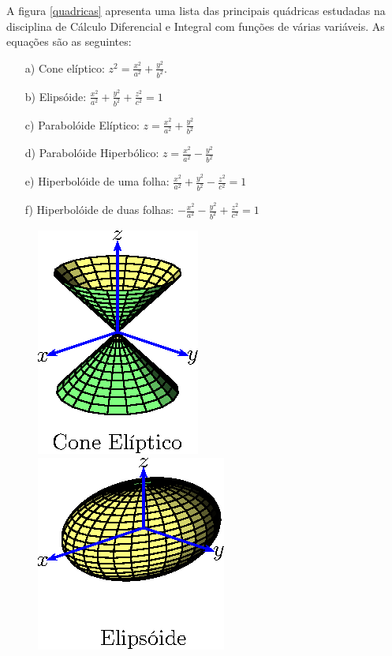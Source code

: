 \begin{ex}
A figura \ref{quadricas} apresenta uma lista das principais quádricas estudadas na disciplina de Cálculo Diferencial e Integral com funções de várias variáveis. As equações são as seguintes:
\begin{itemize}
\item[a)] Cone elíptico: $\displaystyle z^2=\frac{x^2}{a^2}+\frac{y^2}{b^2}$.
\item[b)] Elipsóide: $\displaystyle \frac{x^2}{a^2}+\frac{y^2}{b^2}+\frac{z^2}{c^2}=1$
\item[c)] Parabolóide Elíptico: $\displaystyle z=\frac{x^2}{a^2}+\frac{y^2}{b^2}$
\item[d)] Parabolóide Hiperbólico: $\displaystyle z=\frac{x^2}{a^2}-\frac{y^2}{b^2}$
\item[e)] Hiperbolóide de uma folha: $\displaystyle \frac{x^2}{a^2}+\frac{y^2}{b^2}-\frac{z^2}{c^2}=1$
\item[f)] Hiperbolóide de duas folhas:  $\displaystyle -\frac{x^2}{a^2}-\frac{y^2}{b^2}+\frac{z^2}{c^2}=1$
\end{itemize}
\begin{figure}[htp]
\begin{minipage}{5cm}
\includegraphics{cap_superficies/figs/figura_2}
\end{minipage}\begin{minipage}{5cm}
\includegraphics{cap_superficies/figs/figura_3}

\end{minipage}
\end{figure}
\end{ex}
